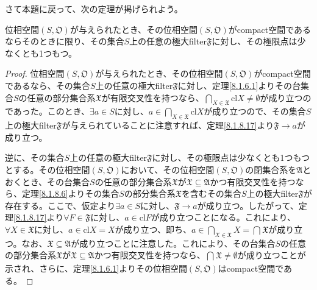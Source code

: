 \documentclass[dvipdfmx]{jsarticle}
\begin{document}
さて本題に戻って、次の定理が掲げられよう。
\begin{thm}\label{8.1.8.19}
位相空間$\left( S,\mathfrak{O} \right)$が与えられたとき、その位相空間$\left( S,\mathfrak{O} \right)$がcompact空間であるならそのときに限り、その集合$S$上の任意の極大filter$\mathfrak{F}$に対し、その極限点は少なくとも1つもつ。
\end{thm}
\begin{proof}
位相空間$\left( S,\mathfrak{O} \right)$が与えられたとき、その位相空間$\left( S,\mathfrak{O} \right)$がcompact空間であるなら、その集合$S$上の任意の極大filter$\mathfrak{F}$に対し、定理\ref{8.1.6.1}よりその台集合$S$の任意の部分集合系$\mathfrak{X}$が有限交叉性を持つなら、$\bigcap_{X \in \mathfrak{X}} {{\mathrm{cl}}X} \neq \emptyset$が成り立つのであった。このとき、$\exists a \in S$に対し、$a \in \bigcap_{X \in \mathfrak{X}} {{\mathrm{cl}}X}$が成り立つので、その集合$S$上の極大filter$\mathfrak{F}$が与えられていることに注意すれば、定理\ref{8.1.8.17}より$\mathfrak{F} \rightarrow a$が成り立つ。\par
逆に、その集合$S$上の任意の極大filter$\mathfrak{F}$に対し、その極限点は少なくとも1つもつとする。その位相空間$\left( S,\mathfrak{O} \right)$において、その位相空間$\left( S,\mathfrak{O} \right)$の閉集合系を$\mathfrak{A}$とおくとき、その台集合$S$の任意の部分集合系$\mathfrak{X}$が$\mathfrak{X \subseteq A}$かつ有限交叉性を持つなら、定理\ref{8.1.8.6}よりその集合$S$の部分集合系$\mathfrak{X}$を含むその集合$S$上の極大filter$\mathfrak{F}$が存在する。ここで、仮定より$\exists a \in S$に対し、$\mathfrak{F} \rightarrow a$が成り立つ。したがって、定理\ref{8.1.8.17}より$\forall F \in \mathfrak{F}$に対し、$a \in {\mathrm{cl}}F$が成り立つことになる。これにより、$\forall X \in \mathfrak{X}$に対し、$a \in {\mathrm{cl}}X = X$が成り立つ、即ち、$a \in \bigcap_{X \in \mathfrak{X}} X = \bigcap_{} \mathfrak{X}$が成り立つ。なお、$\mathfrak{X \subseteq A}$が成り立つことに注意した。これにより、その台集合$S$の任意の部分集合系$\mathfrak{X}$が$\mathfrak{X \subseteq A}$かつ有限交叉性を持つなら、$\bigcap_{} \mathfrak{X} \neq \emptyset$が成り立つことが示され、さらに、定理\ref{8.1.6.1}よりその位相空間$\left( S,\mathfrak{O} \right)$はcompact空間である。
\end{proof}
\end{document}

